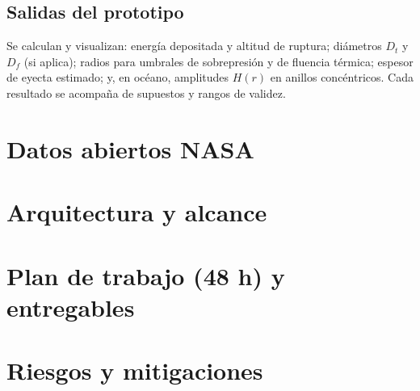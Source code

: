 \documentclass[conference]{IEEEtran}
\begin{document}
\subsection{Salidas del prototipo}
Se calculan y visualizan: energía depositada y altitud de ruptura; diámetros $D_t$ y $D_f$ (si aplica); radios para umbrales de sobrepresión y de fluencia térmica; espesor de eyecta estimado; y, en océano, amplitudes $H(r)$ en anillos concéntricos. Cada resultado se acompaña de supuestos y rangos de validez.

\section{Datos abiertos NASA}

\section{Arquitectura y alcance}

\section{Plan de trabajo (48 h) y entregables}

\section{Riesgos y mitigaciones}

\end{document}
